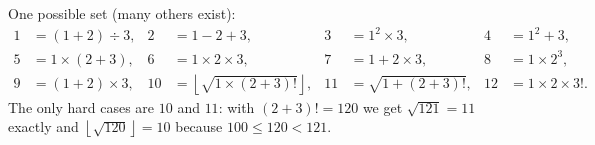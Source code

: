 One possible set (many others exist):
\[
\begin{aligned}
1&=(1+2)\div3, & 2&=1-2+3, & 3&=1^2\times3, & 4&=1^2+3,\\
5&=1\times(2+3), & 6&=1\times2\times3, & 7&=1+2\times3, & 8&=1\times2^3,\\
9&=(1+2)\times3, & 10&=\left\lfloor\sqrt{1\times(2+3)!}\right\rfloor, & 11&=\sqrt{1+(2+3)!}, & 12&=1\times2\times3!.
\end{aligned}
\]
The only hard cases are $10$ and $11$: with $(2+3)!=120$ we get $\sqrt{121}=11$ exactly and $\left\lfloor\sqrt{120}\right\rfloor=10$ because $100\le120<121$.
